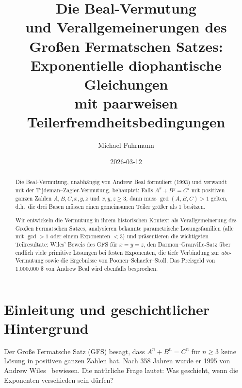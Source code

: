 \documentclass[12pt,a4paper]{amsart}
\theoremstyle{definition}
\theoremstyle{remark}
\begin{document}
\title{Die Beal-Vermutung\\
und Verallgemeinerungen des Großen Fermatschen Satzes:\\
Exponentielle diophantische Gleichungen\\
mit paarweisen Teilerfremdheitsbedingungen}

\author{Michael Fuhrmann}
\address{Specialist Mathematics Project, Build 166}
\date{2026-03-12}

\begin{abstract}
Die Beal-Vermutung, unabhängig von Andrew Beal formuliert (1993) und verwandt
mit der Tijdeman--Zagier-Vermutung, behauptet: Falls $A^x + B^y = C^z$ mit
positiven ganzen Zahlen $A, B, C, x, y, z$ und $x, y, z \geq 3$, dann muss
$\gcd(A, B, C) > 1$ gelten, d.h.\ die drei Basen müssen einen gemeinsamen Teiler
größer als $1$ besitzen.

Wir entwickeln die Vermutung in ihrem historischen Kontext als Verallgemeinerung
des Großen Fermatschen Satzes, analysieren bekannte parametrische Lösungsfamilien
(alle mit $\gcd > 1$ oder einem Exponenten $< 3$) und präsentieren die wichtigsten
Teilresultate: Wiles' Beweis des GFS für $x = y = z$, den Darmon--Granville-Satz
über endlich viele primitive Lösungen bei festen Exponenten, die tiefe Verbindung
zur $abc$-Vermutung sowie die Ergebnisse von Poonen--Schaefer--Stoll.
Das Preisgeld von $1{.}000{.}000$ \$ von Andrew Beal wird ebenfalls besprochen.
\end{abstract}

\maketitle

\tableofcontents

\section{Einleitung und geschichtlicher Hintergrund}

Der Große Fermatsche Satz (GFS) besagt, dass $A^n + B^n = C^n$ für $n \geq 3$
keine Lösung in positiven ganzen Zahlen hat. Nach 358 Jahren wurde er 1995 von
Andrew Wiles~\cite{Wiles95} bewiesen. Die natürliche Frage lautet: Was geschieht,
wenn die Exponenten verschieden sein dürfen?
\end{document}
